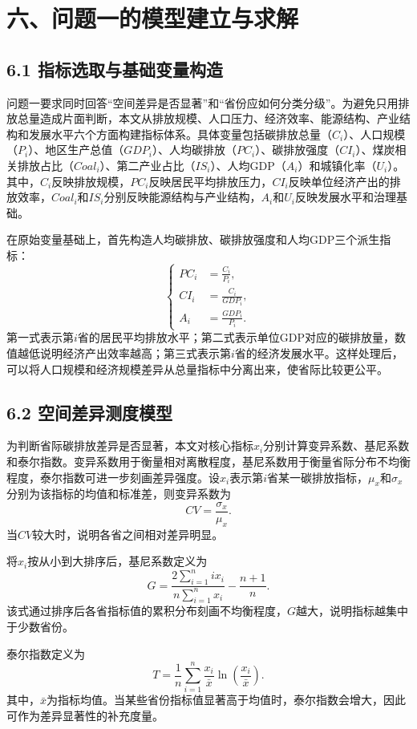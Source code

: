 \documentclass[UTF8,zihao=-4,fontset=fandol]{ctexart}
\begin{document}
\section*{六、问题一的模型建立与求解}

\subsection*{6.1 指标选取与基础变量构造}

问题一要求同时回答“空间差异是否显著”和“省份应如何分类分级”。为避免只用排放总量造成片面判断，本文从排放规模、人口压力、经济效率、能源结构、产业结构和发展水平六个方面构建指标体系。具体变量包括碳排放总量（$C_i$）、人口规模（$P_i$）、地区生产总值（$GDP_i$）、人均碳排放（$PC_i$）、碳排放强度（$CI_i$）、煤炭相关排放占比（$Coal_i$）、第二产业占比（$IS_i$）、人均GDP（$A_i$）和城镇化率（$U_i$）。其中，$C_i$反映排放规模，$PC_i$反映居民平均排放压力，$CI_i$反映单位经济产出的排放效率，$Coal_i$和$IS_i$分别反映能源结构与产业结构，$A_i$和$U_i$反映发展水平和治理基础。

在原始变量基础上，首先构造人均碳排放、碳排放强度和人均GDP三个派生指标：
\[
\left\{
\begin{aligned}
PC_i&=\frac{C_i}{P_i},\\
CI_i&=\frac{C_i}{GDP_i},\\
A_i&=\frac{GDP_i}{P_i}.
\end{aligned}
\right.
\]
第一式表示第$i$省的居民平均排放水平；第二式表示单位GDP对应的碳排放量，数值越低说明经济产出效率越高；第三式表示第$i$省的经济发展水平。这样处理后，可以将人口规模和经济规模差异从总量指标中分离出来，使省际比较更公平。

\subsection*{6.2 空间差异测度模型}

为判断省际碳排放差异是否显著，本文对核心指标$x_i$分别计算变异系数、基尼系数和泰尔指数。变异系数用于衡量相对离散程度，基尼系数用于衡量省际分布不均衡程度，泰尔指数可进一步刻画差异强度。设$x_i$表示第$i$省某一碳排放指标，$\mu_x$和$\sigma_x$分别为该指标的均值和标准差，则变异系数为
\[
CV=\frac{\sigma_x}{\mu_x}.
\]
当$CV$较大时，说明各省之间相对差异明显。

将$x_i$按从小到大排序后，基尼系数定义为
\[
G=\frac{2\sum_{i=1}^{n}ix_i}{n\sum_{i=1}^{n}x_i}-\frac{n+1}{n}.
\]
该式通过排序后各省指标值的累积分布刻画不均衡程度，$G$越大，说明指标越集中于少数省份。

泰尔指数定义为
\[
T=\frac{1}{n}\sum_{i=1}^{n}\frac{x_i}{\bar{x}}\ln\left(\frac{x_i}{\bar{x}}\right).
\]
其中，$\bar{x}$为指标均值。当某些省份指标值显著高于均值时，泰尔指数会增大，因此可作为差异显著性的补充度量。
\end{document}
